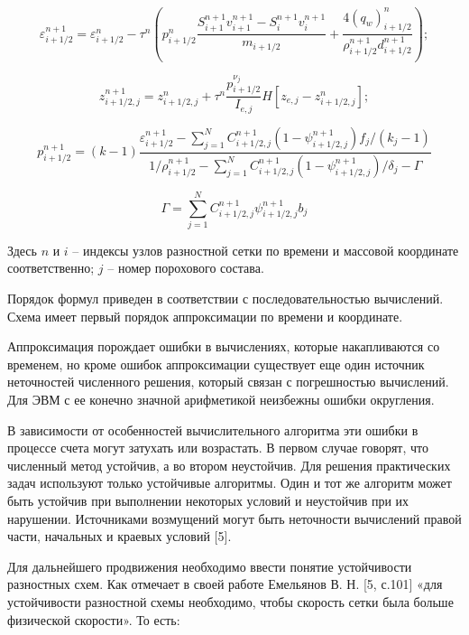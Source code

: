 \documentclass[14pt, a4paper]{extreport} %
\begin{document}
\begin{equation}
\varepsilon_{i+1/2}^{n+1} = \varepsilon_{i+1/2}^n - \tau^n \left( p_{i+1/2}^n \frac{S_{i+1}^{n+1} v_{i+1}^{n+1} - S_i^{n+1} v_i^{n+1}}{m_{i+1/2}} + \frac{4(q_w)_{i+1/2}^n}{\rho_{i+1/2}^{n+1} d_{i+1/2}^{n+1}} \right);
\end{equation}

\begin{equation}
z_{i+1/2,j}^{n+1} = z_{i+1/2,j}^n + \tau^n \frac{p_{i+1/2}^{\nu_j}}{I_{e,j}} H [z_{e,j} - z_{i+1/2,j}^n];
\end{equation}

\begin{equation}
p_{i+1/2}^{n+1} = (k-1) \frac{\varepsilon_{i+1/2}^{n+1} - \sum_{j=1}^N C_{i+1/2,j}^{n+1} (1 - \psi_{i+1/2,j}^{n+1}) f_j / (k_j - 1)}{1/\rho_{i+1/2}^{n+1} - \sum_{j=1}^N C_{i+1/2,j}^{n+1} (1 - \psi_{i+1/2,j}^{n+1}) / \delta_j - \Gamma }
\end{equation}

\[
\Gamma = \sum_{j=1}^N C_{i+1/2,j}^{n+1} \psi_{i+1/2,j}^{n+1} b_j
\]


Здесь \( n \) и \( i \) -- индексы узлов разностной сетки по времени и массовой координате соответственно; \( j \) -- номер порохового состава.

Порядок формул приведен в соответствии с последовательностью вычислений. Схема имеет первый порядок аппроксимации по времени и координате.

Аппроксимация порождает ошибки в вычислениях, которые накапливаются со временем, но кроме ошибок аппроксимации существует еще один источник неточностей численного решения, который связан с погрешностью вычислений. Для ЭВМ с ее конечно значной арифметикой неизбежны ошибки округления.

В зависимости от особенностей вычислительного алгоритма эти ошибки в процессе счета могут затухать или возрастать. В первом случае говорят, что численный метод устойчив, а во втором неустойчив. Для решения практических задач используют только устойчивые алгоритмы. Один и тот же алгоритм может быть устойчив при выполнении некоторых условий и неустойчив при их нарушении. Источниками возмущений могут быть неточности вычислений правой части, начальных и краевых условий [5].

Для дальнейшего продвижения необходимо ввести понятие устойчивости разностных схем. Как отмечает в своей работе Емельянов В. Н. [5, с.101] «для устойчивости разностной схемы необходимо, чтобы скорость сетки была больше физической скорости». То есть:
\end{document}
